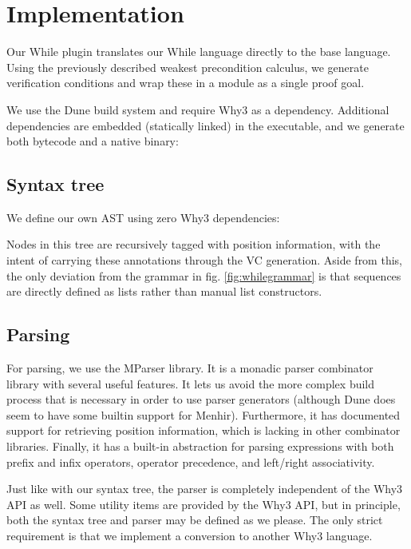 \section{Implementation} %

Our While plugin translates our While language directly to the base language.
Using the previously described weakest precondition calculus,
we generate verification conditions and wrap these in a module as a single proof goal.

We use the Dune build system\cite{dunesite} and require Why3 as a dependency.
Additional dependencies are embedded (statically linked) in the executable,
and we generate both bytecode and a native binary:


\subsection{Syntax tree}

We define our own AST using zero Why3 dependencies:

Nodes in this tree are recursively tagged with position information,
with the intent of carrying these annotations through the VC generation.
Aside from this, the only deviation from the grammar in fig. \ref{fig:whilegrammar}
is that sequences are directly defined as lists rather than manual list constructors.

\subsection{Parsing}

For parsing, we use the MParser library\cite{mparser}.
It is a monadic parser combinator library with several useful features.
It lets us avoid the more complex build process
that is necessary in order to use parser generators
(although Dune does seem to have some builtin support for Menhir).
Furthermore, it has documented support for retrieving position information,
which is lacking in other combinator libraries.
Finally, it has a built-in abstraction for parsing expressions with both prefix and infix operators,
operator precedence, and left/right associativity.

Just like with our syntax tree,
the parser is completely independent of the Why3 API as well.
Some utility items are provided by the Why3 API,
but in principle,
both the syntax tree and parser may be defined as we please.
The only strict requirement is that we implement a conversion to another Why3 language.

